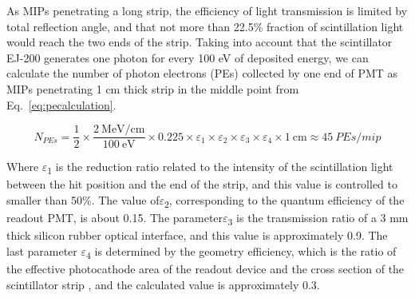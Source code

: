 \documentclass[5p, times]{elsarticle}
\begin{document}
As MIPs penetrating a long strip, the efficiency of light transmission is limited by total reflection angle, and that
not more than 22.5\% fraction of scintillation light would reach the two ends of the strip. Taking into account that
the scintillator EJ-200 generates one photon for every 100 eV of deposited energy, we can calculate the number of
photon electrons (PEs) collected by one end of PMT as MIPs penetrating 1 cm thick strip in the middle point from
Eq.~\ref{eq:pecalculation}.

\begin{equation}
 N_{PEs} = \frac{1}{2} \times \frac{\SI[per-mode=symbol]{2}{\mega\electronvolt\per\centi\meter}}{\SI{100}{\electronvolt}} \times 0.225
           \times \varepsilon_{1} \times \varepsilon_{2} \times \varepsilon_{3} \times \varepsilon_{4} \times \SI{1}{\centi\meter}
        \approx \SI{45}{PEs/mip}
\label{eq:pecalculation}
\end{equation} 

Where $\varepsilon $\textsubscript{1} is the reduction ratio related to the intensity of the scintillation light between
the hit position and the end of the strip, and this value is controlled to smaller than 50\%. The value of$\varepsilon
$\textsubscript{2}, corresponding to the quantum efficiency of the readout PMT, is about 0.15. The
parameter$\varepsilon $\textsubscript{3 }is the transmission ratio of a 3 mm thick silicon rubber optical interface,
and this value is approximately 0.9. The last parameter $\varepsilon $\textsubscript{4 }is determined by the geometry
efficiency, which is the ratio of the effective photocathode area of the readout device and the cross section of the
scintillator strip , and the calculated value is approximately 0.3.
\end{document}
